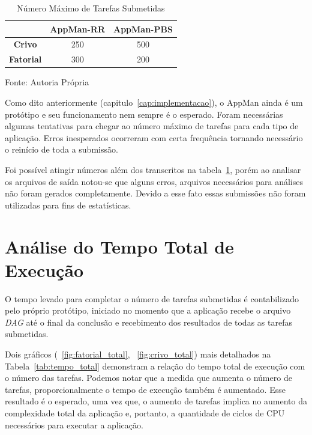 \begin{table}[hbtp]
\begin{center}
\caption{Número Máximo de Tarefas Submetidas}
\label{tab:num_max_tarefas}
\begin{tabular}{c|c|c}
	\hline
		& {\bf AppMan-RR} & {\bf AppMan-PBS}\\
	\hline
	{\bf Crivo} & 250 & 500\\ \hline
	\textbf{Fatorial} & 300 & 200\\ \hline
\end{tabular}
\end{center}
\begin{center}
Fonte: Autoria Própria
\end{center}
\end{table}

Como dito anteriormente (capitulo~\ref{cap:implementacao}), o AppMan ainda é um protótipo e seu funcionamento nem sempre é o esperado. Foram necessárias algumas tentativas para chegar ao número máximo de tarefas para cada tipo de aplicação. Erros inesperados ocorreram com certa frequência tornando necessário o reinício de toda a submissão. 

Foi possível atingir números além dos transcritos na tabela~\ref{tab:num_max_tarefas}, porém ao analisar os arquivos de saída notou-se que alguns erros, arquivos necessários para análises não foram gerados completamente. Devido a esse fato essas submissões não foram utilizadas para fins de estatísticas.

\section{Análise do Tempo Total de Execução}

O tempo levado para completar o número de tarefas submetidas é contabilizado pelo próprio protótipo, iniciado no momento que a aplicação recebe o arquivo \emph{DAG} até o final da conclusão e recebimento dos resultados de todas as tarefas submetidas. 

Dois gráficos (~\ref{fig:fatorial_total}, ~\ref{fig:crivo_total}) mais detalhados na Tabela~\ref{tab:tempo_total} demonstram a relação do tempo total de execução com o número das tarefas. Podemos notar que a medida que aumenta o número de tarefas, proporcionalmente o tempo de execução também é aumentado. Esse resultado é o esperado, uma vez que, o aumento de tarefas implica no aumento da complexidade total da aplicação e, portanto, a quantidade de ciclos de CPU necessários para executar a aplicação.

